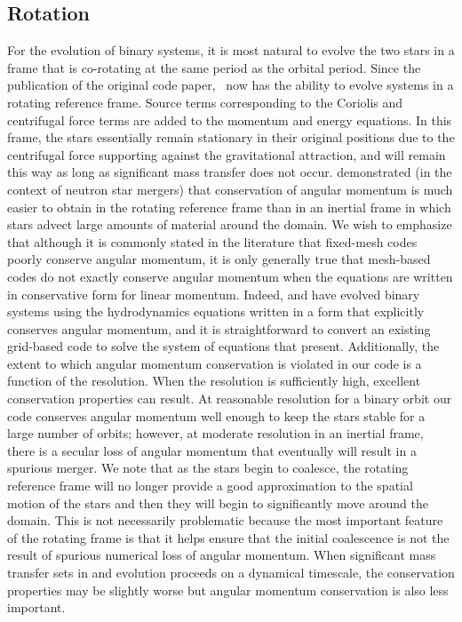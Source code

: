 \documentclass[12pt]{article}
\begin{document}
\subsection{Rotation}
\label{sec:rotation}

For the evolution of binary systems, it is most natural to evolve the
two stars in a frame that is co-rotating at the same period as the
orbital period. Since the publication of the original code paper, \castro\ 
now has the ability to evolve systems in a rotating reference frame. 
Source terms corresponding to the Coriolis and centrifugal 
force terms are added to the momentum and energy equations. In this frame, 
the stars essentially remain stationary in their original positions due to the
centrifugal force supporting against the gravitational attraction, and
will remain this way as long as significant mass transfer does not
occur. \cite{swc:2000} demonstrated (in the context of neutron star
mergers) that conservation of angular momentum is much easier to
obtain in the rotating reference frame than in an inertial frame in
which stars advect large amounts of material around the domain. We
wish to emphasize that although it is commonly stated in the
literature that fixed-mesh codes poorly conserve angular momentum,
it is only generally true that mesh-based codes do not exactly conserve 
angular momentum when the equations are written in conservative form
for linear momentum. Indeed, \cite{motl:2002} and \cite{byerly:2014} 
have evolved binary systems using the hydrodynamics equations written 
in a form that explicitly conserves angular momentum, and it is 
straightforward to convert an existing grid-based code to solve 
the system of equations that \citeauthor{byerly:2014} present.
Additionally, the extent to which angular momentum conservation is violated in our code
is a function of the resolution. When the resolution is sufficiently high, 
excellent conservation properties can result. At reasonable resolution 
for a binary orbit our code conserves angular momentum well enough 
to keep the stars stable for a large number of orbits; however, at moderate 
resolution in an inertial frame, there is a secular loss of angular 
momentum that eventually will result in a spurious merger.
We note that as the stars begin to coalesce, the rotating reference frame
will no longer provide a good approximation to the spatial motion of
the stars and then they will begin to significantly move around the
domain. This is not necessarily problematic because the most important
feature of the rotating frame is that it helps ensure that the initial
coalescence is not the result of spurious numerical loss of angular
momentum. When significant mass transfer sets in and evolution
proceeds on a dynamical timescale, the conservation properties may be
slightly worse but angular momentum conservation is also less
important.
\end{document}
